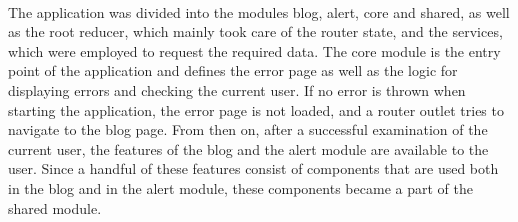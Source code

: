 \documentclass[Bachelor,BIF,english]{twbook}
\begin{document}
\\[\baselineskip]
The application was divided into the modules blog, alert, core and shared, as well as the root reducer, which mainly took care of the router state, and the services, which were employed to request the required data. The core module is the entry point of the application and defines the error page as well as the logic for displaying errors and checking the current user. If no error is thrown when starting the application, the error page is not loaded, and a router outlet tries to navigate to the blog page. From then on, after a successful examination of the current user, the features of the blog and the alert module are available to the user. Since a handful of these features consist of components that are used both in the blog and in the alert module, these components became a part of the shared module.
\end{document}
